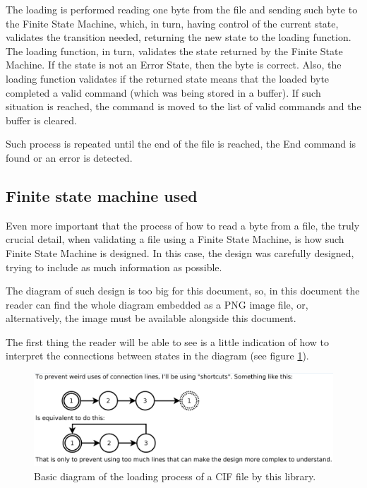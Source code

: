 \documentclass[11pt,twoside,openany,x11names,svgnames]{memoir}
\begin{document}
The loading is performed reading one byte from the file and sending such byte to the Finite State Machine, which, in turn, having control of the current state, validates the transition needed, returning the new state to the loading function. The loading function, in turn, validates the state returned by the Finite State Machine. If the state is not an Error State, then the byte is correct. Also, the loading function validates if the returned state means that the loaded byte completed a valid command (which was being stored in a buffer). If such situation is reached, the command is moved to the list of valid commands and the buffer is cleared.

Such process is repeated until the end of the file is reached, the End command is found or an error is detected.

\subsection{Finite state machine used}\label{Finite-state-machine-used}

Even more important that the process of how to read a byte from a file, the truly crucial detail, when validating a file using a Finite State Machine, is how such Finite State Machine is designed. In this case, the design was carefully designed, trying to include as much information as possible.

The diagram of such design is too big for this document, so, in this document the reader can find the whole diagram embedded as a PNG image file, or, alternatively, the image must be available alongside this document.


The first thing the reader will be able to see is a little indication of how to interpret the connections between states in the diagram (see figure \ref{fig:fsmconnections}).

\begin{figure}
	\centering
	\label{fig:fsmconnections}
	\includegraphics[scale=0.5, clip=true, trim= 0pt 0pt 0pt 0pt]{images/chapter03-image08}
	\caption{Basic diagram of the loading process of a CIF file by this library.}
\end{figure}
\end{document}
